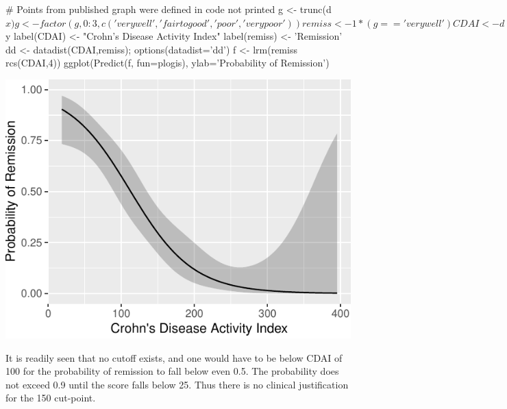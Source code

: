 \begin{Schunk}
\begin{Sinput}
# Points from published graph were defined in code not printed
g <- trunc(d$x)
g <- factor(g, 0:3, c('very well', 'fair to good', 'poor', 'very poor'))
remiss <- 1 * (g == 'very well')
CDAI <- d$y
label(CDAI) <- "Crohn's Disease Activity Index"
label(remiss) <- 'Remission'
dd <- datadist(CDAI,remiss); options(datadist='dd')
f <- lrm(remiss ~ rcs(CDAI,4))
ggplot(Predict(f, fun=plogis), ylab='Probability of Remission')
\end{Sinput}


\centerline{\includegraphics[width=\maxwidth]{info-devlogist-1} }

\end{Schunk}

It is readily seen that no cutoff exists, and one would have to be
below CDAI of 100 for the probability of remission to fall below even
0.5.  The probability does not exceed 0.9 until the score falls below
25.  Thus there is no clinical justification for the 150 cut-point.

